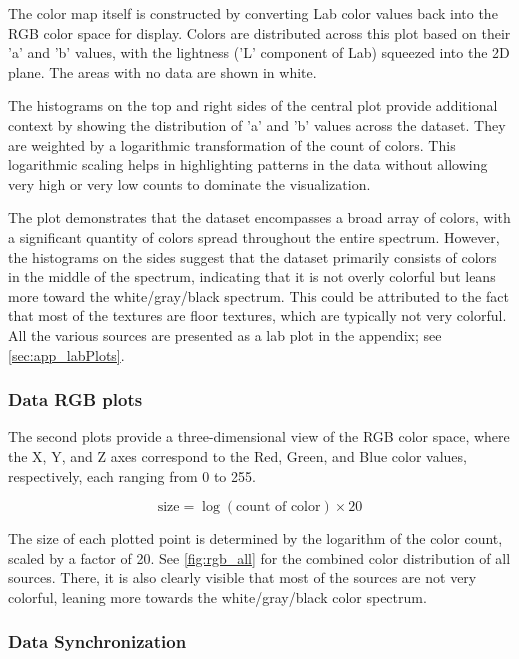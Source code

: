    The color map itself is constructed by converting Lab color values back into the RGB color space for display. Colors are distributed across this plot based on their 'a' and 'b' values, with the lightness ('L' component of Lab) squeezed into the 2D plane. The areas with no data are shown in white.

    The histograms on the top and right sides of the central plot provide additional context by showing the distribution of 'a' and 'b' values across the dataset. They are weighted by a logarithmic transformation of the count of colors. This logarithmic scaling helps in highlighting patterns in the data without allowing very high or very low counts to dominate the visualization.

    The plot demonstrates that the dataset encompasses a broad array of colors, with a significant quantity of colors spread throughout the entire spectrum. However, the histograms on the sides suggest that the dataset primarily consists of colors in the middle of the spectrum, indicating that it is not overly colorful but leans more toward the white/gray/black spectrum. This could be attributed to the fact that most of the textures are floor textures, which are typically not very colorful. All the various sources are presented as a lab plot in the appendix; see \autoref{sec:app_labPlots}.

    \subsubsection{Data RGB plots}

    The second plots provide a three-dimensional view of the RGB color space, where the X, Y, and Z axes correspond to the Red, Green, and Blue color values, respectively, each ranging from 0 to 255. 

    \[
    \text{size} = \log(\text{count of color}) \times 20
    \]

    The size of each plotted point is determined by the logarithm of the color count, scaled by a factor of 20. See \autoref{fig:rgb_all} for the combined color distribution of all sources. There, it is also clearly visible that most of the sources are not very colorful, leaning more towards the white/gray/black color spectrum.

    \subsubsection{Data Synchronization}

